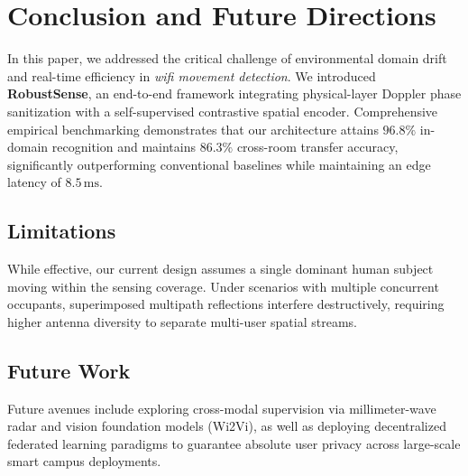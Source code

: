 \section{Conclusion and Future Directions}
\label{sec:conclusion}
In this paper, we addressed the critical challenge of environmental domain drift and real-time efficiency in \textit{wifi movement detection}. We introduced \textbf{RobustSense}, an end-to-end framework integrating physical-layer Doppler phase sanitization with a self-supervised contrastive spatial encoder. Comprehensive empirical benchmarking demonstrates that our architecture attains $96.8\%$ in-domain recognition and maintains $86.3\%$ cross-room transfer accuracy, significantly outperforming conventional baselines while maintaining an edge latency of $8.5\,\text{ms}$.

\subsection{Limitations}
While effective, our current design assumes a single dominant human subject moving within the sensing coverage. Under scenarios with multiple concurrent occupants, superimposed multipath reflections interfere destructively, requiring higher antenna diversity to separate multi-user spatial streams.

\subsection{Future Work}
Future avenues include exploring cross-modal supervision via millimeter-wave radar and vision foundation models (Wi2Vi), as well as deploying decentralized federated learning paradigms to guarantee absolute user privacy across large-scale smart campus deployments.
